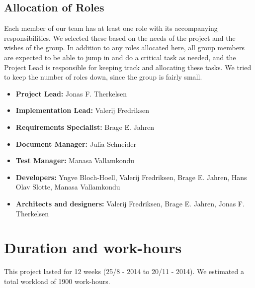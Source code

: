 \subsection{Allocation of Roles}
Each member of our team has at least one role with its accompanying responsibilities. We selected these based on the needs of the project and the wishes of the group. In addition to any roles allocated here, all group members are expected to be able to jump in and do a critical task as needed, and the Project Lead is responsible for keeping track and allocating these tasks. We tried to keep the number of roles down, since the group is fairly small.

\begin{itemize}
\item \textbf{Project Lead: } Jonas F. Therkelsen
\item \textbf{Implementation Lead: } Valerij Fredriksen
\item \textbf{Requirements Specialist: } Brage E. Jahren
\item \textbf{Document Manager: } Julia Schneider
\item \textbf{Test Manager: } Manasa Vallamkondu
\item \textbf{Developers: } Yngve Bloch-Hoell, Valerij Fredriksen, Brage E. Jahren, Hans Olav Slotte, Manasa Vallamkondu
\item \textbf{Architects and designers: } Valerij Fredriksen, Brage E. Jahren, Jonas F. Therkelsen 
\end{itemize}

%

\section{Duration and work-hours} This project lasted for 12 weeks (25/8 - 2014 to 20/11 - 2014). We estimated a total workload of 1900 work-hours.